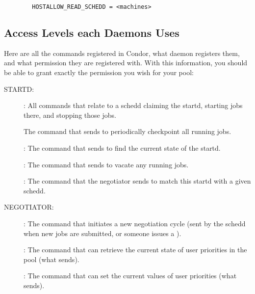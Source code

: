 \begin{verbatim}
        HOSTALLOW_READ_SCHEDD = <machines>
\end{verbatim}

\subsection{Access Levels each Daemons Uses}
\label{sec:DCPerm-per-Daemon}

Here are all the commands registered in Condor, what daemon registers
them, and what permission they are registered with.  With this
information, you should be able to grant exactly the permission you
wish for your pool:


STARTD:

\begin{description}
\item[] : All commands that relate to a schedd claiming
  the startd, starting jobs there, and stopping those jobs.

  The command that  sends to periodically checkpoint
  all running jobs.

\item[] : The command that  sends to find the
  current state of the startd.

\item[] : The command that  sends to vacate
  any running jobs.

\item[] : The command that the negotiator sends to
  match this startd with a given schedd.
\end{description}

NEGOTIATOR:

\begin{description}
\item[] : The command that initiates a new negotiation
  cycle (sent by the schedd when new jobs are submitted, or someone
  issues a ).

\item[] : The command that can retrieve the current state
  of user priorities in the pool (what  sends).

\item[] : The command that can set the current
  values of user priorities (what  sends).
\end{description}

